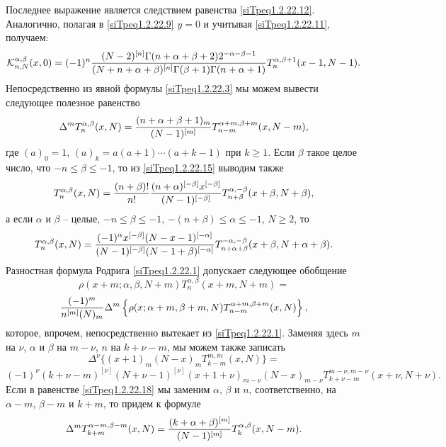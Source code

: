  Последнее выражение
является следствием равенства \eqref{siTpeq1.2.22.12}. Аналогично, полагая в \eqref{siTpeq1.2.22.9}
$y=0$ и учитывая \eqref{siTpeq1.2.22.11}, получаем:
\begin{equation}\label{siTpeq1.2.22.14} \mathcal{K}_{n,N}^{\alpha,\beta}(x,0)=(-1)^n
{(N-2)^{[n]}\Gamma(n+\alpha+\beta+2)2^{-\alpha-\beta-1}\over
(N+n+\alpha+\beta)^{[n]}\Gamma(\beta+1)\Gamma(n+\alpha+1)}
T_n^{\alpha,\beta+1}(x-1,N-1).
\end{equation}
  Непосредственно из явной формулы \eqref{siTpeq1.2.22.3} мы можем вывести следующее
     полезное равенство
\begin{equation}\label{siTpeq1.2.22.15}
\Delta^m T_n^{\alpha,\beta}(x,N)={(n+\alpha+\beta+1)_m\over
(N-1)^{[m]}} T_{n-m}^{\alpha+m,\beta+m}(x,N-m),
\end{equation}
где $(a)_0=1$, $(a)_k=a(a+1)\cdots(a+k-1)$ при $k\ge1$. Если $\beta$
такое целое число, что $-n\le\beta\le-1$, то из \eqref{siTpeq1.2.22.15} выводим также
\begin{equation}\label{siTpeq1.2.22.16}
T_n^{\alpha,\beta}(x,N)={(n+\beta)!\over n!}
{(n+\alpha)^{[-\beta]}x^{[-\beta]}\over (N-1)^{[-\beta]}}
T_{n+\beta}^{\alpha,-\beta}(x+\beta,N+\beta),
 \end{equation}
 а если $\alpha$ и $\beta$ -- целые, $-n\le\beta\le-1$, $-(n+\beta)\le\alpha\le-1$,
$N\ge2$, то \begin{equation}\label{siTpeq1.2.22.17} T_n^{\alpha,\beta}(x,N)={(-1)^\alpha
x^{[-\beta]}(N-x-1)^{[-\alpha]}\over
(N-1)^{[-\beta]}(N-1+\beta)^{[-\alpha]}}
T_{n+\alpha+\beta}^{-\alpha,-\beta}(x+\beta,N+\alpha+\beta). \end{equation}
Разностная формула Родрига \eqref{siTpeq1.2.22.1} допускает следующее
обобщение
     $$
\rho(x+m;\alpha,\beta,N+m)T_n^{\alpha,\beta}(x+m,N+m)= $$
\begin{equation}\label{siTpeq1.2.22.18}
{(-1)^m\over n^{[m]}(N)_m}\Delta^m
\left\{\rho(x;\alpha+m,\beta+m,N)T_{n-m}^{\alpha+m,\beta+m}(x,N)\right\},
 \end{equation}
 которое, впрочем, непосредственно вытекает из \eqref{siTpeq1.2.22.1}.
Заменяя здесь  $m$ на $\nu$,  $\alpha$ и $\beta$  на $m-\nu$, $n$ на
$k+\nu-m$, мы можем также записать
$$\Delta^\nu\{(x+1)_m(N-x)_mT_{k-m}^{m,m}(x,N)\}=
$$\begin{equation}\label{siTpeq1.2.22.19}(-1)^\nu(k+\nu-m)^{[\nu]}(N+\nu-1)^{[\nu]}(x+1+\nu)_{m-\nu}(N-x)_{m-\nu}T_{k+\nu-m}^{m-\nu,m-\nu}(x+\nu,N+\nu).\end{equation}
 Если в равенстве \eqref{siTpeq1.2.22.18}  мы заменим $\alpha$, $\beta$ и $n$,
     соответственно, на   $\alpha-m$, $\beta-m$ и $k+m$, то придем
     к формуле
\begin{equation}\label{siTpeq1.2.22.20}
\Delta^m T_{k+m}^{\alpha-m,\beta-m}(x,N)={(k+\alpha+\beta)^{[m]}
\over (N-1)^{[m]}}T_k^{\alpha,\beta}(x,N-m).
\end{equation}



